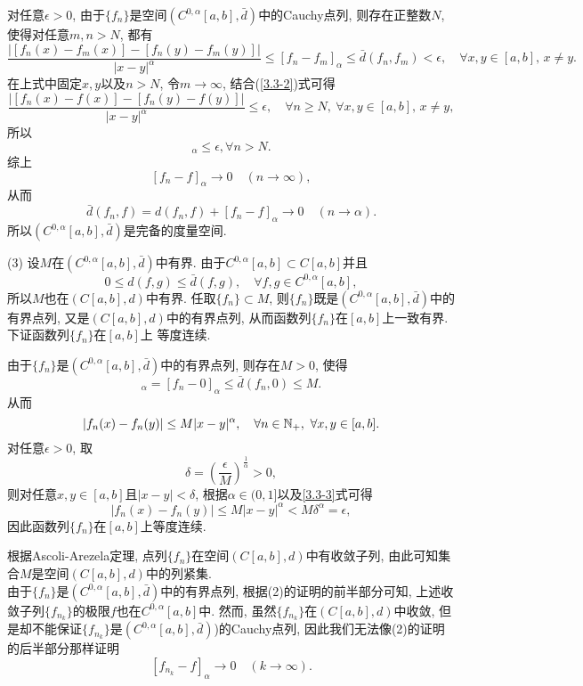 \documentclass[UTF8,oneside,12pt]{article}  %
\makeatletter
\theoremstyle{DingLi1}
\numberwithin{equation}{section}
\theoremstyle{DingLi2}
\renewenvironment{proof}[1][\proofname]{\par%
\pushQED{\qed}%
\normalfont \topsep6\p@\@plus6\p@\relax%
\trivlist%
\item[\hskip\labelsep%
#1]\ignorespaces%
}{%
\popQED\endtrivlist\@endpefalse%
}
\renewcommand{\proofname}{\heiti\large\color{blue} 证明}%
\makeatother
\begin{document}
\begin{proof}
对任意$\epsilon>0$, 由于$\{f_n\}$是空间$(C^{0,\alpha}[a,b],\bar{d})$中的Cauchy点列, 则存在正整数$N$, 使得对任意$m,n>N$, 都有
\begin{equation*}
\frac{\big|[f_n(x)-f_m(x)]-[f_n(y)-f_m(y)]\big|}{|x-y|^\alpha}\leq [f_n-f_m]_\alpha \leq \bar{d}(f_n,f_m)<\epsilon,\quad \forall x,y\in [a,b],\,x\neq y.
\end{equation*}
在上式中固定$x,y$以及$n>N$, 令$m\to\infty$, 结合(\ref{3.3-2})式可得
\begin{equation*}
\frac{\big|[f_n(x)-f(x)]-[f_n(y)-f(y)]\big|}{|x-y|^\alpha}\leq \epsilon,\quad \forall n\geq N,\ \forall x,y\in [a,b],\,x\neq y,
\end{equation*}
所以
\begin{equation*}
  [f_n-f]_\alpha\leq \epsilon, \forall n>N.
\end{equation*}
综上
$$[f_n-f]_\alpha\to 0\quad (n\to \infty),$$
从而
$$\bar{d}(f_n,f)=d(f_n,f)+[f_n-f]_\alpha\to 0\quad(n\to \alpha).$$
所以$(C^{0,\alpha}[a,b],\bar{d})$是完备的度量空间.



(3) 设$M$在$(C^{0,\alpha}[a,b],\bar{d})$中有界. 由于$C^{0,\alpha}[a,b]\subset C[a,b]$并且
$$0\leq d(f,g)\leq  \bar{d}(f,g), \quad\forall f,g\in C^{0,\alpha}[a,b],$$
所以$M$也在$(C[a,b],d)$中有界. 任取$\{f_n\}\subset M$, 则$\{f_n\}$既是$(C^{0,\alpha}[a,b],\bar{d})$中的有界点列, 又是$(C[a,b],d)$中的有界点列, 从而函数列$\{f_n\}$在$[a,b]$上一致有界. 下证函数列$\{f_n\}$在$[a,b]$上
等度连续.

由于$\{f_n\}$是$(C^{0,\alpha}[a,b],\bar{d})$中的有界点列, 则存在$M>0$, 使得
\begin{equation*}
[f_n]_\alpha =[f_n-0]_\alpha \leq \bar{d}(f_n,0)\leq M.
\end{equation*}
从而
\begin{equation}\label{3.3-3}
|f_n(x)-f_n(y)|\leq M |x-y|^\alpha,\quad \forall n\in \Bbb{N}_+,\ \forall x,y\in [a,b].
\end{equation}
对任意$\epsilon>0$, 取
$$\delta=\left(\frac{\epsilon}{M}\right)^{\frac{1}{\alpha}}>0,$$
则对任意$x,y\in [a,b]$且$|x-y|<\delta$, 根据$\alpha\in (0,1]$以及\eqref{3.3-3}式可得
$$|f_n(x)-f_n(y)|\leq M |x-y|^\alpha<M\delta^\alpha=\epsilon,$$
因此函数列$\{f_n\}$在$[a,b]$上等度连续.

根据Ascoli-Arezela定理, 点列$\{f_n\}$在空间$(C[a,b],d)$中有收敛子列, 由此可知集合$M$是空间$(C[a,b],d)$中的列紧集.\\
\textcolor[rgb]{1.00,0.00,0.00}{由于$\{f_n\}$是$(C^{0,\alpha}[a,b],\bar{d})$中的有界点列, 根据(2)的证明的前半部分可知, 上述收敛子列$\{f_{n_k}\}$的极限$f$也在$C^{0,\alpha}[a,b]$中. 然而, 虽然$\{f_{n_k}\}$在$(C[a,b],d)$中收敛, 但是却不能保证$\{f_{n_k}\}$是$(C^{0,\alpha}[a,b],\bar{d})$)的Cauchy点列, 因此我们无法像(2)的证明的后半部分那样证明
$$\left[f_{n_k}-f\right]_\alpha \to 0\quad (k\to \infty).$$}
\end{proof}
\end{document}
